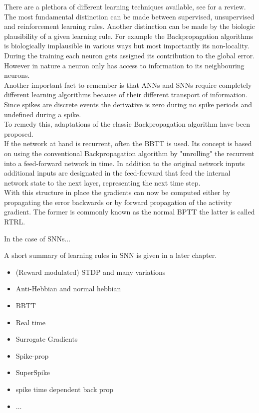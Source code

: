 	There are a plethora of different learning techniques available, see \cite{abdolrasol_artificial_2021}\cite{sun_survey_2019} for a review. The most fundamental distinction can be made between supervised, unsupervised and reinforcement learning rules.
	Another distinction can be made by the biologic plausibility of a given learning rule. For example the Backpropagation algorithms is biologically implausible in various ways but most importantly its non-locality. During the training each neuron gets assigned its contribution to the global error. However in nature a neuron only has access to information to its neighbouring neurons.\\
	Another important fact to remember is that \acp{ANN} and \acp{SNN} require completely different learning algorithms because of their different transport of information. Since spikes are discrete events the derivative is zero during no spike periods and undefined during a spike.\\
	To remedy this, adaptations of the classic Backpropagation algorithm have been proposed.\\
	If the network at hand is recurrent, often the \ac{BBTT} is used. Its concept is based on using the conventional Backpropagation algorithm by "unrolling" the recurrent into a feed-forward network in time. In addition to the original network inputs additional inputs are designated in the feed-forward that feed the internal network state to the next layer, representing the next time step.\\
	With this structure in place the gradients can now be computed either by propagating the error backwards or by forward propagation of the activity gradient. The former is commonly known as the normal \ac{BPTT} the latter is called \ac{RTRL}\cite{williams_gradient-based_1995}.


	In the case of \acp{SNN}...



	A short summary of learning rules in \ac{SNN} is given in a later chapter.\\



	\begin{itemize}
	\item (Reward modulated) STDP and many variations
	\item Anti-Hebbian and normal hebbian
	\item BBTT
	\item Real time
	\item Surrogate Gradients
	\item Spike-prop
	\item SuperSpike
	\item spike time dependent back prop
	\item $\dots$
	\end{itemize}


